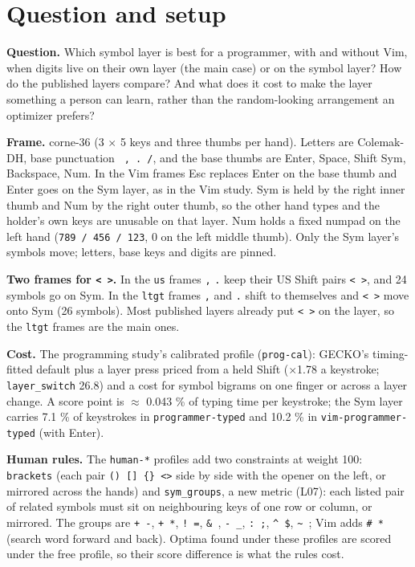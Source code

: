 \documentclass{gecko-paper}
\begin{document}
{\small
\section{Question and setup}

\textbf{Question.} Which symbol layer is best for a programmer, with and without Vim, when digits live on their own layer (the main case) or on the symbol layer? How do the published layers compare? And what does it cost to make the layer something a person can learn, rather than the random-looking arrangement an optimizer prefers?

\textbf{Frame.} corne-36 (3 $\times$ 5 keys and three thumbs per hand). Letters are Colemak-DH, base punctuation \texttt{\textquotesingle{}\ ,\ .\ /}, and the base thumbs are Enter, Space, Shift \textbar{} Sym, Backspace, Num. In the Vim frames Esc replaces Enter on the base thumb and Enter goes on the Sym layer, as in the Vim study. Sym is held by the right inner thumb and Num by the right outer thumb,
so the other hand types and the holder's own keys are unusable on that layer. Num holds a fixed numpad on the left hand (\texttt{789\ /\ 456\ /\ 123}, 0 on the left middle thumb). Only the Sym layer's symbols move; letters, base keys and digits are pinned.

\textbf{Two frames for \texttt{\textless{}\ \textgreater{}}.} In the \texttt{us} frames \texttt{,} \texttt{.} keep their US Shift pairs \texttt{\textless{}\ \textgreater{}}, and 24 symbols go on Sym. In the \texttt{ltgt} frames \texttt{,} and \texttt{.} shift to themselves and \texttt{\textless{}\ \textgreater{}} move onto Sym (26 symbols). Most published layers already put
\texttt{\textless{}\ \textgreater{}} on the layer, so the \texttt{ltgt} frames are the main ones.

\textbf{Cost.} The programming study's calibrated profile (\texttt{prog-cal}): GECKO's timing-fitted default plus a layer press priced from a held Shift ($\times$1.78 a keystroke; \texttt{layer\_switch} 26.8) and a cost for symbol bigrams on one finger or across a layer change. A score point is $\approx$ 0.043 \% of typing time per keystroke; the Sym layer carries 7.1 \% of keystrokes in
\texttt{programmer-typed} and 10.2 \% in \texttt{vim-programmer-typed} (with Enter).

\textbf{Human rules.} The \texttt{human-*} profiles add two constraints at weight 100: \texttt{brackets} (each pair \texttt{()\ {[}{]}\ \{\}\ \textless{}\textgreater{}} side by side with the opener on the left, or mirrored across the hands) and \texttt{sym\_groups}, a new metric (L07): each listed pair of related symbols must sit on neighbouring keys of one row or column, or mirrored. The groups
are \texttt{+\ -}, \texttt{+\ *}, \texttt{!\ =}, \texttt{\&\ \textbar{}}, \texttt{-\ \_}, \texttt{:\ ;}, \texttt{\^{}\ \$}, \texttt{\textasciitilde{}\ \textasciigrave{}}; Vim adds \texttt{\#\ *} (search word forward and back). Optima found under these profiles are scored under the free profile, so their score difference is what the rules cost.

}
\end{document}
